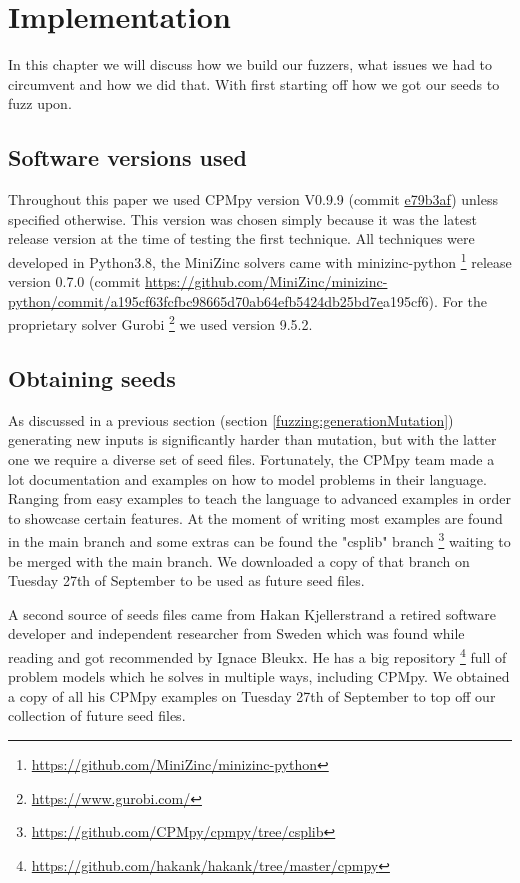 \chapter{Implementation}
\label{cha:impl}
\label{impl:Intro}
In this chapter we will discuss how we build our fuzzers, what issues we had to circumvent and how we did that. With first starting off how we got our seeds to fuzz upon.

\section{Software versions used}
Throughout this paper we used CPMpy version V0.9.9 (commit \href{https://github.com/CPMpy/cpmpy/commit/e79b3afedc934a9437c2ddb3a9f54d7e2d7bd3ee}{e79b3af}) unless specified otherwise. This version was chosen simply because it was the latest release version at the time of testing the first technique. All techniques were developed in Python3.8, the MiniZinc solvers came with minizinc-python \footnote{\url{https://github.com/MiniZinc/minizinc-python}} release version 0.7.0 (commit \url{https://github.com/MiniZinc/minizinc-python/commit/a195cf63fcfbc98665d70ab64efb5424db25bd7e}{a195cf6}). For the proprietary solver Gurobi \footnote{\url{https://www.gurobi.com/}} we used version 9.5.2.

\section{Obtaining seeds}
\label{impl:obtainingSeeds}
As discussed in a previous section (section \ref{fuzzing:generationMutation}) generating new inputs is significantly harder than mutation, but with the latter one we require a diverse set of seed files. Fortunately, the CPMpy team made a lot documentation and examples on how to model problems in their language. Ranging from easy examples to teach the language to advanced examples in order to showcase certain features. 
At the moment of writing most examples are found in the main branch and some extras can be found the "csplib" branch \footnote{\url{https://github.com/CPMpy/cpmpy/tree/csplib}} waiting to be merged with the main branch. We downloaded a copy of that branch on Tuesday 27th of September to be used as future seed files. 

A second source of seeds files came from Hakan Kjellerstrand a retired software developer and independent researcher from Sweden which was found while reading \cite{18bleukx2022model} and got recommended by Ignace Bleukx. He has a big repository \footnote{\url{https://github.com/hakank/hakank/tree/master/cpmpy}} full of problem models which he solves in multiple ways, including CPMpy. We obtained a copy of all his CPMpy examples on Tuesday 27th of September to top off our collection of future seed files.


